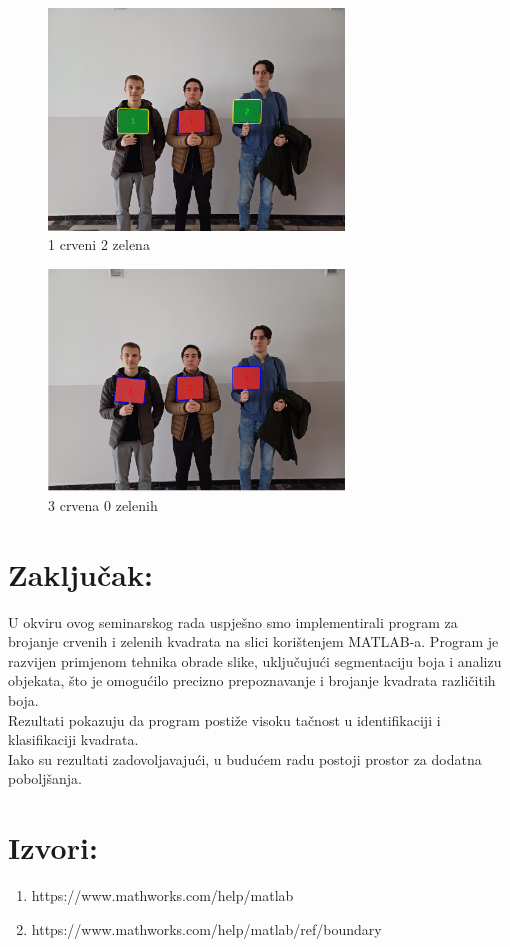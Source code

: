 \documentclass[a4paper,12pt]{article}
\begin{document}
\begin{figure}[htbp]
    \centering
    \includegraphics[width=0.7\textwidth]{kolege_2_crop.png}
    \caption{1 crveni 2 zelena}
    \label{fig:example}
\end{figure}


\begin{figure}[htbp]
    \centering
    \includegraphics[width=0.7\textwidth]{kolege_3_crop.png}
    \caption{3 crvena 0 zelenih}
    \label{fig:example}
\end{figure}
\newpage
\section{Zaključak:}
U okviru ovog seminarskog rada uspješno smo implementirali program za brojanje crvenih i zelenih kvadrata na slici korištenjem MATLAB-a. Program je razvijen primjenom tehnika obrade slike, uključujući segmentaciju boja i analizu objekata, što je omogućilo precizno prepoznavanje i brojanje kvadrata različitih boja.
\\

Rezultati pokazuju da program postiže visoku tačnost u identifikaciji i klasifikaciji kvadrata.
\\

Iako su rezultati zadovoljavajući, u budućem radu postoji prostor za dodatna poboljšanja.

\newpage
\section{Izvori:}

\begin{enumerate}
	\item https://www.mathworks.com/help/matlab
	\item https://www.mathworks.com/help/matlab/ref/boundary
\end{enumerate}
\end{document}

